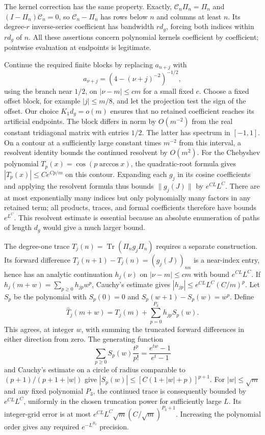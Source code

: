 The kernel correction has the same property. Exactly,
\(\mathcal C_n\Pi_n=\Pi_n\) and
\((I-\Pi_n)\mathcal C_n=0\), so
\(\mathcal C_n-\Pi_n\) has rows below \(n\) and columns at least
\(n\). Its degree-\(r\) inverse-series coefficient has bandwidth
\(rd_g\), forcing both indices within \(rd_g\) of \(n\).
All these assertions concern polynomial kernels coefficient by
coefficient; pointwise evaluation at endpoints is legitimate.

Continue the required finite blocks by replacing \(a_{n+j}\) with
\[
 a_{\nu+j}=(4-(\nu+j)^{-2})^{-1/2},
\]
using the branch near \(1/2\), on \(|\nu-m|\le cm\) for a small
fixed \(c\). Choose a fixed offset block, for example
\(|j|\le m/8\), and let the projection test the sign of the offset.
Our choice \(K_1d_g=o(m)\) ensures that no retained coefficient
reaches its artificial endpoints. The block differs in norm by
\(O(m^{-2})\) from the real constant tridiagonal matrix with entries
\(1/2\). The latter has spectrum in \([-1,1]\). On a contour at
a sufficiently large constant times \(m^{-2}\) from this interval,
a resolvent identity bounds the continued resolvent by \(O(m^2)\).
For the Chebyshev polynomial \(T_p(x)=\cos(p\arccos x)\), the
quadratic-root formula gives
\( |T_p(x)|\le C e^{Cp/m}\) on this contour. Expanding each
\(g_j\) in its cosine coefficients and applying the resolvent
formula thus bounds \(\|g_j(J)\|\) by \(e^{CL}L^C\).
There are at most exponentially many indices but only polynomially
many factors in any retained term; all products, traces, and formal
coefficients therefore have bounds \(e^{L^C}\). This resolvent
estimate is essential because an absolute enumeration of paths of
length \(d_g\) would give a much larger bound.

The degree-one trace
\(T_j(n)=\operatorname{Tr}(\Pi_ng_j\Pi_n)\) requires a separate
construction. Its forward difference
\(T_j(n+1)-T_j(n)=(g_j(J))_{nn}\) is a near-index entry, hence has
an analytic continuation \(h_j(\nu)\) on \(|\nu-m|\le cm\)
with bound \(e^{CL}L^C\). If
\(h_j(m+w)=\sum_{p\ge0}h_{jp}w^p\), Cauchy's estimate gives
\(|h_{jp}|\le e^{CL}L^C(C/m)^p\). Let \(S_p\) be the polynomial
with \(S_p(0)=0\) and
\(S_p(w+1)-S_p(w)=w^p\). Define
\[
 \widehat T_j(m+w)=T_j(m)+\sum_{p=0}^{P_3}h_{jp}S_p(w).
\]
This agrees, at integer \(w\), with summing the truncated forward
differences in either direction from zero. The generating function
\[
 \sum_{p\ge0}S_p(w)\frac{t^p}{p!}
          =\frac{e^{tw}-1}{e^t-1}
\]
and Cauchy's estimate on a circle of radius comparable to
\((p+1)/(p+1+|w|)\) give
\( |S_p(w)|\le[C(1+|w|+p)]^{p+1}\).
For \(|w|\le\sqrt m\) and any fixed polynomial \(P_3\), the
continued trace is consequently bounded by \(e^{CL}L^C\), uniformly
in the chosen truncation power for sufficiently large \(L\).
Its integer-grid error is at most
\(e^{CL}L^C\sqrt m(C/\sqrt m)^{P_3+1}\).
Increasing the polynomial order gives any required
\(e^{-L^{B_3}}\) precision.

